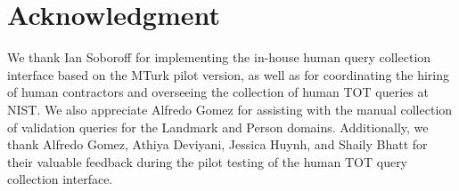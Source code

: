 \section{Acknowledgment}
We thank Ian Soboroff for implementing the in-house human query collection interface based on the MTurk pilot version, as well as for coordinating the hiring of human contractors and overseeing the collection of human TOT queries at NIST.
We also appreciate Alfredo Gomez for assisting with the manual collection of validation queries for the Landmark and Person domains.
Additionally, we thank Alfredo Gomez, Athiya Deviyani, Jessica Huynh, and Shaily Bhatt for their valuable feedback during the pilot testing of the human TOT query collection interface.